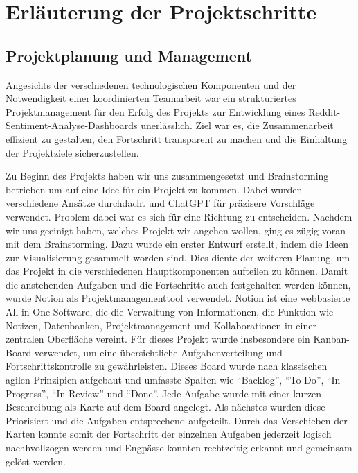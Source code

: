 \section{Erläuterung der Projektschritte}
\subsection{Projektplanung und Management}

Angesichts der verschiedenen technologischen Komponenten und der Notwendigkeit einer koordinierten Teamarbeit war ein strukturiertes Projektmanagement für den Erfolg des Projekts zur Entwicklung eines Reddit-Sentiment-Analyse-Dashboards unerlässlich. Ziel war es, die Zusammenarbeit effizient zu gestalten, den Fortschritt transparent zu machen und die Einhaltung der Projektziele sicherzustellen. 

Zu Beginn des Projekts haben wir uns zusammengesetzt und Brainstorming betrieben um auf eine Idee für ein Projekt zu kommen. Dabei wurden verschiedene Ansätze durchdacht und ChatGPT für präzisere Vorschläge verwendet. Problem dabei war es sich für eine Richtung zu entscheiden. Nachdem wir uns geeinigt haben, welches Projekt wir angehen wollen, ging es zügig voran mit dem Brainstorming. Dazu wurde ein erster Entwurf erstellt, indem die Ideen zur Visualisierung gesammelt worden sind. Dies diente der weiteren Planung, um das Projekt in die verschiedenen Hauptkomponenten aufteilen zu können. Damit die anstehenden Aufgaben und die Fortschritte auch festgehalten werden können, wurde Notion als Projektmanagementtool verwendet. Notion ist eine webbasierte All-in-One-Software, die die Verwaltung von Informationen, die Funktion wie Notizen, Datenbanken, Projektmanagement und Kollaborationen in einer zentralen Oberfläche vereint. Für dieses Projekt wurde insbesondere ein Kanban-Board verwendet, um eine übersichtliche Aufgabenverteilung und Fortschrittskontrolle zu gewährleisten. Dieses Board wurde nach klassischen agilen Prinzipien aufgebaut und umfasste Spalten wie \enquote{Backlog}, \enquote{To Do}, \enquote{In Progress}, \enquote{In Review} und \enquote{Done}. Jede Aufgabe wurde mit einer kurzen Beschreibung als Karte auf dem Board angelegt. Als nächstes wurden diese Priorisiert und die Aufgaben entsprechend aufgeteilt. Durch das Verschieben der Karten konnte somit der Fortschritt der einzelnen Aufgaben jederzeit logisch nachhvollzogen werden und Engpässe konnten rechtzeitig erkannt  und gemeinsam gelöst werden.

